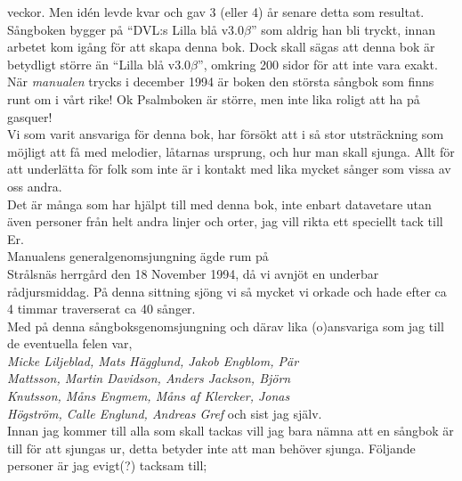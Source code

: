 \documentclass[a6paper,fontsize=10pt,twoside,openright]{scrbook}
\begin{document}
veckor. Men idén levde kvar och gav 3 (eller 4) år senare detta som
resultat.\\ \indent Sångboken bygger på ``DVL:s Lilla blå
v3.0$\beta$'' som aldrig han bli tryckt, innan arbetet kom igång för
att skapa denna bok. Dock skall sägas att denna bok är betydligt
större än ``Lilla blå v3.0$\beta$'', omkring 200 sidor för att inte
vara exakt.\\ \indent När \textit{manualen} trycks i december 1994 är
boken den största sångbok som finns runt om i vårt rike! Ok Psalmboken
är större, men inte lika roligt att ha på gasquer!\\ \indent Vi som
varit ansvariga för denna bok, har försökt att i så stor utsträckning
som möjligt att få med melodier, låtarnas ursprung, och hur man skall
sjunga. Allt för att underlätta för folk som inte är i kontakt med
lika mycket sånger som vissa av oss andra.\\ \indent Det är många som
har hjälpt till med denna bok, inte enbart datavetare utan även
personer från helt andra linjer och orter, jag vill rikta ett
speciellt tack till Er.\\ \indent Manualens generalgenomsjungning ägde
rum på\\ Strålsnäs herrgård den 18 November 1994, då vi avnjöt en
underbar rådjursmiddag. På denna sittning sjöng vi så mycket vi orkade
och hade efter ca 4 timmar traverserat ca 40 sånger.\\ \indent Med på
denna sångboksgenomsjungning och därav lika (o)ansvariga som jag till
de eventuella felen var,\\ \textit{Micke Liljeblad, Mats Hägglund, Jakob
  Engblom, Pär\\ Mattsson, Martin Davidson, Anders Jackson, Björn\\
  Knutsson, Måns Engmem, Måns af Klercker, Jonas\\ Högström, Calle
  Englund, Andreas Gref} och sist jag själv.\\ \indent Innan jag
kommer till alla som skall tackas vill jag bara nämna att en sångbok
är till för att sjungas ur, detta betyder inte att man behöver
sjunga. Följande personer är jag evigt(?) tacksam till;\\
\end{document}
